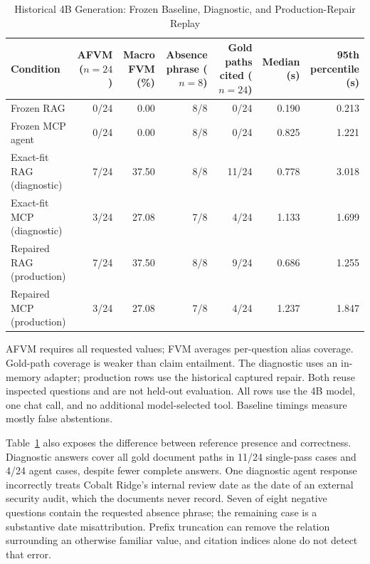 \documentclass[conference,letterpaper]{IEEEtran}
\begin{document}
\begin{table}[t]
\caption{Historical 4B Generation: Frozen Baseline, Diagnostic, and Production-Repair Replay}
\label{tab:generation}
\centering\small
\setlength{\tabcolsep}{5pt}
\begin{tabular}{@{}lrrrrrr@{}}
\toprule
Condition & \shortstack{AFVM\\($n=24$)} & \shortstack{Macro FVM\\(\%)} & \shortstack{Absence phrase\\($n=8$)} & \shortstack{Gold paths cited\\($n=24$)} & \shortstack{Median\\(s)} & \shortstack{95th percentile\\(s)} \\
\midrule
Frozen RAG & 0/24 & 0.00 & 8/8 & 0/24 & 0.190 & 0.213 \\
Frozen MCP agent & 0/24 & 0.00 & 8/8 & 0/24 & 0.825 & 1.221 \\
Exact-fit RAG (diagnostic) & 7/24 & 37.50 & 8/8 & 11/24 & 0.778 & 3.018 \\
Exact-fit MCP (diagnostic) & 3/24 & 27.08 & 7/8 & 4/24 & 1.133 & 1.699 \\
Repaired RAG (production) & 7/24 & 37.50 & 8/8 & 9/24 & 0.686 & 1.255 \\
Repaired MCP (production) & 3/24 & 27.08 & 7/8 & 4/24 & 1.237 & 1.847 \\
\bottomrule
\end{tabular}
\vspace{3pt}
\parbox{0.96\textwidth}{\footnotesize AFVM requires all requested values; FVM averages per-question alias coverage. Gold-path coverage is weaker than claim entailment. The diagnostic uses an in-memory adapter; production rows use the historical captured repair. Both reuse inspected questions and are not held-out evaluation. All rows use the 4B model, one chat call, and no additional model-selected tool. Baseline timings measure mostly false abstentions.}
\end{table}

Table~\ref{tab:generation} also exposes the difference between reference presence and correctness. Diagnostic answers cover all gold document paths in 11/24 single-pass cases and 4/24 agent cases, despite fewer complete answers. One diagnostic agent response incorrectly treats Cobalt Ridge's internal review date as the date of an external security audit, which the documents never record. Seven of eight negative questions contain the requested absence phrase; the remaining case is a substantive date misattribution. Prefix truncation can remove the relation surrounding an otherwise familiar value, and citation indices alone do not detect that error.
\end{document}
